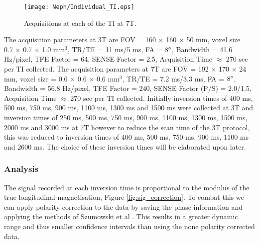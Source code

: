 \begin{figure}[H]
	\centering
	\texttt{[image: Neph/Individual\_TI.eps]}
	\caption{Acquisitions at each of the \ac{TI} at 7T.}
	\label{fig:inversion_recovery_data}	
\end{figure}

The acquisition parameters at 3T are \ac{FOV} = 160 $\times$ 160 $\times$ 50 mm, voxel size = 0.7 $\times$ 0.7 $\times$ 1.0 mm$^3$, \ac{TR}/\ac{TE} = 11 ms/5 ms, \ac{FA} = $8\degree$, Bandwidth = 41.6 Hz/pixel, \ac{TFE} Factor = 64, \ac{SENSE} Factor = 2.5, Acquisition Time $\approx$ 270 sec per \ac{TI} collected. The acquisition parameters at 7T are \ac{FOV} = 192 $\times$ 170 $\times$ 24 mm, voxel size = 0.6 $\times$ 0.6 $\times$ 0.6 mm$^3$, \ac{TR}/\ac{TE} = 7.2 ms/3.3 ms, \ac{FA} = $8\degree$, Bandwidth = 56.8 Hz/pixel, \ac{TFE} Factor = 240, \ac{SENSE} Factor (P/S) = 2.0/1.5, Acquisition Time $\approx$ 270 sec per \ac{TI} collected. Initially inversion times of 400 ms, 500 ms, 750 ms, 900 ms, 1100 ms, 1300 ms and 1500 ms were collected at 3T and inversion times of 250 ms, 500 ms, 750 ms, 900 ms, 1100 ms, 1300 ms, 1500 ms, 2000 ms and 3000 ms at 7T however to reduce the scan time of the 3T protocol, this was reduced to inversion times of 400 ms, 500 ms, 750 ms, 900 ms, 1100 ms and 2600 ms. The choice of these inversion times will be elaborated upon later.
\subsubsection{Analysis}

The signal recorded at each inversion time is proportional to the modulus of the true longitudinal magnetisation, Figure \ref{fig:sig_correction}. 
To combat this we can apply polarity correction to the data by saving the phase information and applying the methods of Szumowski et al \cite{szumowski_signal_2012}. This results in a greater dynamic range and thus smaller confidence intervals than using the none polarity corrected data.



